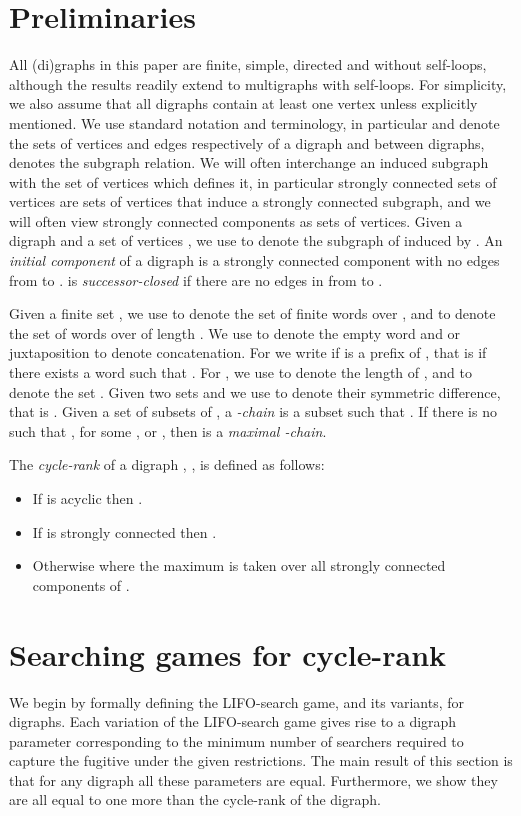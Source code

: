 \documentclass{llncs}
\begin{document}
\section{Preliminaries}\label{sec:prelim}
All (di)graphs in this paper are finite, simple, directed and without self-loops, although the results readily extend to multigraphs with self-loops.  For simplicity, we also assume that all digraphs contain at least one vertex unless explicitly mentioned.  We use standard notation and terminology, in particular  and  denote the sets of vertices and edges respectively of a digraph  and between digraphs,  denotes the subgraph relation.  We will often interchange an induced subgraph with the set of vertices which defines it, in particular strongly connected sets of vertices are sets of vertices that induce a strongly connected subgraph, and we will often view strongly connected components as sets of vertices.  Given a digraph  and a set of vertices , we use  to denote the subgraph of  induced by .  An \emph{initial component} of a digraph  is a strongly connected component  with no edges from  to .   is \emph{successor-closed} if there are no edges in  from  to .

Given a finite set , we use  to denote the set of finite words over , and  to denote the set of words over  of length .  We use  to denote the empty word and  or juxtaposition to denote concatenation.  For  we write  if  is a prefix of , that is if there exists a word  such that .  For , we use  to denote the length of , and  to denote the set .  Given two sets  and  we use  to denote their symmetric difference, that is .  Given a set  of subsets of , a \emph{-chain} is a subset  such that .  If there is no  such that ,  for some , or , then  is a \emph{maximal -chain}.

The \emph{cycle-rank} of a digraph , , is defined as follows:
\begin{itemize}
\item If  is acyclic then .
\item If  is strongly connected then .
\item Otherwise  where the maximum is taken over all strongly connected components  of .
\end{itemize}


\section{Searching games for cycle-rank}\label{sec:game}
We begin by formally defining the LIFO-search game, and its variants, for digraphs.  Each variation of the LIFO-search game gives rise to a digraph parameter corresponding to the minimum number of searchers required to capture the fugitive under the given restrictions.  The main result of this section is that for any digraph all these parameters are equal.  Furthermore, we show they are all equal to
one more than the cycle-rank of the digraph.
\end{document}
